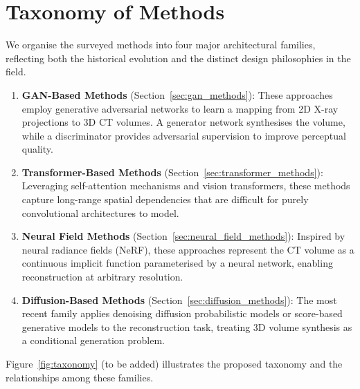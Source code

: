 
\section{Taxonomy of Methods}
\label{sec:taxonomy}

We organise the surveyed methods into four major architectural families, reflecting both the historical evolution and the distinct design philosophies in the field.

\begin{enumerate}
  \item \textbf{GAN-Based Methods} (Section~\ref{sec:gan_methods}): These approaches employ generative adversarial networks to learn a mapping from 2D X-ray projections to 3D CT volumes. A generator network synthesises the volume, while a discriminator provides adversarial supervision to improve perceptual quality.

  \item \textbf{Transformer-Based Methods} (Section~\ref{sec:transformer_methods}): Leveraging self-attention mechanisms and vision transformers, these methods capture long-range spatial dependencies that are difficult for purely convolutional architectures to model.

  \item \textbf{Neural Field Methods} (Section~\ref{sec:neural_field_methods}): Inspired by neural radiance fields (NeRF), these approaches represent the CT volume as a continuous implicit function parameterised by a neural network, enabling reconstruction at arbitrary resolution.

  \item \textbf{Diffusion-Based Methods} (Section~\ref{sec:diffusion_methods}): The most recent family applies denoising diffusion probabilistic models or score-based generative models to the reconstruction task, treating 3D volume synthesis as a conditional generation problem.
\end{enumerate}

Figure~\ref{fig:taxonomy} (to be added) illustrates the proposed taxonomy and the relationships among these families.

